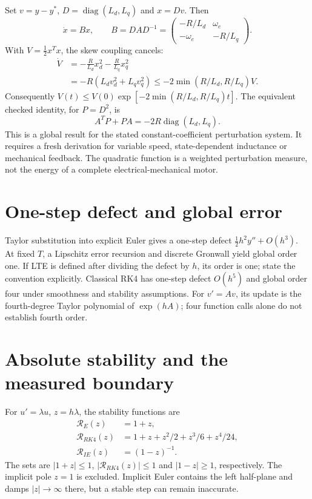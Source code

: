 \documentclass[11pt]{article}
\begin{document}
Set $v=y-y^*$, $D=\operatorname{diag}(L_d,L_q)$ and $x=Dv$. Then
\[
\dot x=Bx,\qquad B=DAD^{-1}=
\begin{pmatrix}-R/L_d&\omega_e\\-\omega_e&-R/L_q\end{pmatrix}.
\]
With $V=\tfrac12x^Tx$, the skew coupling cancels:
\begin{align}
\dot V&=-\frac R{L_d}x_d^2-\frac R{L_q}x_q^2\\
&=-R(L_dv_d^2+L_qv_q^2)
\le-2\min(R/L_d,R/L_q)V.
\end{align}
Consequently $V(t)\le V(0)\exp[-2\min(R/L_d,R/L_q)t]$.
The equivalent checked identity, for $P=D^2$, is
\[
A^TP+PA=-2R\operatorname{diag}(L_d,L_q).
\]
This is a global result for the stated constant-coefficient perturbation system.
It requires a fresh derivation for variable speed, state-dependent inductance or
mechanical feedback. The quadratic function is a weighted perturbation measure,
not the energy of a complete electrical-mechanical motor.

\section{One-step defect and global error}
Taylor substitution into explicit Euler gives a one-step defect
$\tfrac12h^2 y''+O(h^3)$. At fixed $T$, a Lipschitz error recursion and discrete
Gronwall yield global order one. If LTE is defined after dividing the defect by $h$,
its order is one; state the convention explicitly.
Classical RK4 has one-step defect $O(h^5)$ and global order four under smoothness
and stability assumptions. For $v'=Av$, its update is the fourth-degree Taylor
polynomial of $\exp(hA)$; four function calls alone do not establish fourth order.

\newpage
\section{Absolute stability and the measured boundary}
For $u'=\lambda u$, $z=h\lambda$, the stability functions are
\begin{align}
\mathcal R_E(z)&=1+z,\\
\mathcal R_{RK4}(z)&=1+z+z^2/2+z^3/6+z^4/24,\\
\mathcal R_{IE}(z)&=(1-z)^{-1}.
\end{align}
The sets are $|1+z|\le1$, $|\mathcal R_{RK4}(z)|\le1$ and $|1-z|\ge1$,
respectively. The implicit pole $z=1$ is excluded. Implicit Euler contains the
left half-plane and damps $|z|\to\infty$ there, but a stable step can remain inaccurate.
\end{document}
